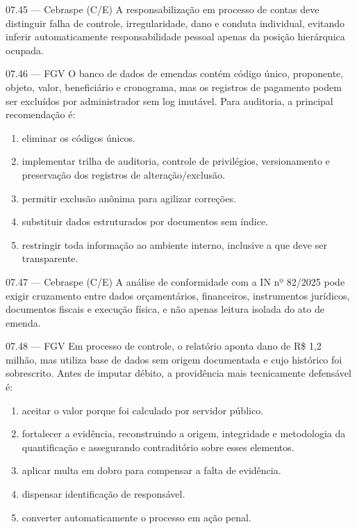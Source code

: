 \begin{questao}{ 07.45 — Cebraspe (C/E)}
A responsabilização em processo de contas deve distinguir falha de controle, irregularidade, dano e conduta individual, evitando inferir automaticamente responsabilidade pessoal apenas da posição hierárquica ocupada.
\end{questao}

\begin{questao}{ 07.46 — FGV}
O banco de dados de emendas contém código único, proponente, objeto, valor, beneficiário e cronograma, mas os registros de pagamento podem ser excluídos por administrador sem log imutável. Para auditoria, a principal recomendação é:
\begin{enumerate}[label=\Alph*)]
\item eliminar os códigos únicos.
\item implementar trilha de auditoria, controle de privilégios, versionamento e preservação dos registros de alteração/exclusão.
\item permitir exclusão anônima para agilizar correções.
\item substituir dados estruturados por documentos sem índice.
\item restringir toda informação ao ambiente interno, inclusive a que deve ser transparente.
\end{enumerate}
\end{questao}

\begin{questao}{ 07.47 — Cebraspe (C/E)}
A análise de conformidade com a IN nº 82/2025 pode exigir cruzamento entre dados orçamentários, financeiros, instrumentos jurídicos, documentos fiscais e execução física, e não apenas leitura isolada do ato de emenda.
\end{questao}

\begin{questao}{ 07.48 — FGV}
Em processo de controle, o relatório aponta dano de R\$ 1,2 milhão, mas utiliza base de dados sem origem documentada e cujo histórico foi sobrescrito. Antes de imputar débito, a providência mais tecnicamente defensável é:
\begin{enumerate}[label=\Alph*)]
\item aceitar o valor porque foi calculado por servidor público.
\item fortalecer a evidência, reconstruindo a origem, integridade e metodologia da quantificação e assegurando contraditório sobre esses elementos.
\item aplicar multa em dobro para compensar a falta de evidência.
\item dispensar identificação de responsável.
\item converter automaticamente o processo em ação penal.
\end{enumerate}
\end{questao}

